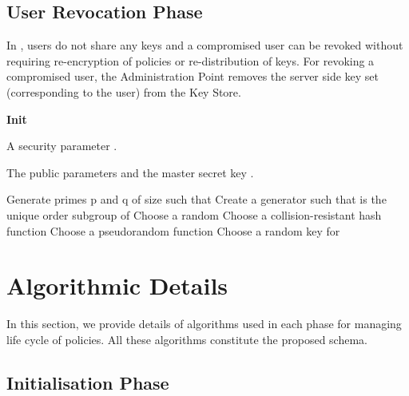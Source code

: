 \documentclass[final,5p,times,twocolumn]{elsarticle}
\newcommand{\algofontsize}{\fontsize{7}{8}\selectfont}
\begin{document}
\subsection{User Revocation Phase}

In , users do not share any keys and a compromised user can be revoked without requiring re-encryption of policies or re-distribution of keys. For revoking a compromised user, the Administration Point removes the server side key set (corresponding to the user) from the Key Store.






\begin{algorithm}[htp]
{\algofontsize
\caption{\textbf{Init}}

\label{algo:init}

\begin{algorithmic}[1]

\REQUIRE A security parameter .

\ENSURE The public parameters  and the master secret key .

\medskip

\STATE Generate primes p and q of size  such that    \label{line:primes}
\STATE Create a generator  such that  is the unique order  subgroup of  \label{line:generator}
\STATE Choose a random  \label{line:master-x}
\STATE  \label{line:params-h}
\STATE Choose a collision-resistant hash function  \label{line:params-H}
\STATE Choose a pseudorandom function  \label{line:params-f}
\STATE Choose a random key  for  \label{line:master-s}
\STATE  \label{line:params}
\STATE  \label{line:master}

\RETURN 

\end{algorithmic}
}
\end{algorithm}



\section{Algorithmic Details}
\label{sec:algorithmic-details}

In this section, we provide details of algorithms used in each phase for managing life cycle of policies. All these algorithms constitute the proposed schema. 

\subsection{Initialisation Phase}
\end{document}
